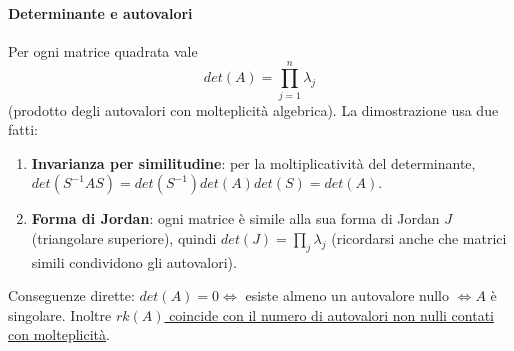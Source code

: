\documentclass[12pt,a4paper,]{report}
\begin{document}
\paragraph{Determinante e autovalori}
    Per ogni matrice quadrata vale 
    \[det(A) = \prod_{j=1}^n \lambda_j\]
    (prodotto degli autovalori con molteplicità algebrica). La dimostrazione usa due fatti:
    \begin{enumerate}
        \item \textbf{Invarianza per similitudine}: per la moltiplicatività del determinante, $det(S^{-1}AS) = det(S^{-1})det(A)det(S) = det(A)$.
        \item \textbf{Forma di Jordan}: ogni matrice è simile alla sua forma di Jordan $J$ (triangolare superiore), quindi $det(J) = \prod_j \lambda_j$ (ricordarsi anche che matrici simili condividono gli autovalori).
    \end{enumerate}
    Conseguenze dirette: $det(A) = 0 \Longleftrightarrow$ esiste almeno un autovalore nullo $\Longleftrightarrow A$ è singolare. 
    Inoltre \uline{$rk(A)$ coincide con il numero di autovalori non nulli contati con molteplicità}.
    \label{th: rk autovalori non nulli}
\end{document}
